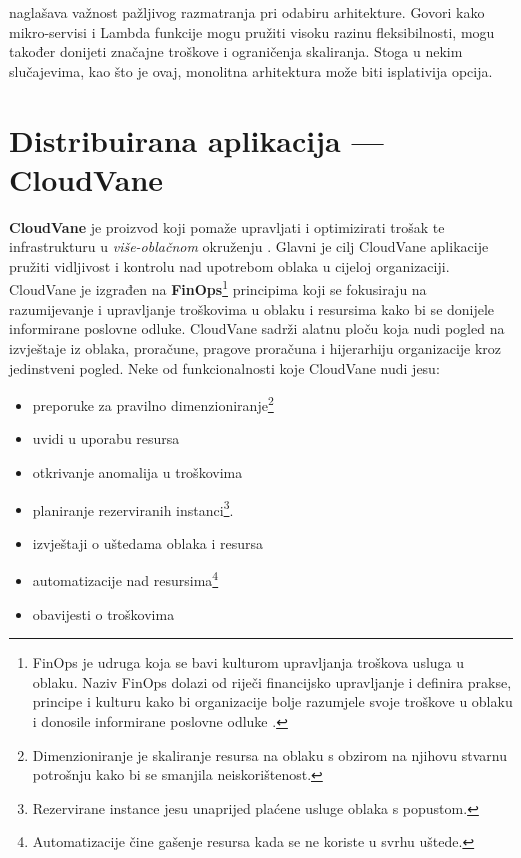 \documentclass[times, utf8, diplomski]{fer}
\begin{document}
\citet{kolny_scaling_2023} naglašava važnost pažljivog razmatranja pri odabiru arhitekture. Govori kako mikro-servisi i Lambda funkcije mogu pružiti visoku razinu fleksibilnosti, mogu također donijeti značajne troškove i ograničenja skaliranja. Stoga u nekim slučajevima, kao što je ovaj, monolitna arhitektura može biti isplativija opcija.



\chapter{Distribuirana aplikacija --- CloudVane}
\label{sec:cloudvane}

\textbf{CloudVane} je proizvod koji pomaže upravljati i optimizirati trošak te infrastrukturu u \emph{više-oblačnom}  okruženju  \citep{neos_cloudvane_2023}. Glavni je cilj CloudVane aplikacije pružiti vidljivost i kontrolu nad upotrebom oblaka  u cijeloj organizaciji. \\

CloudVane je izgrađen na \textbf{FinOps}\footnote{FinOps je udruga koja se bavi kulturom upravljanja troškova usluga u oblaku. Naziv FinOps dolazi od riječi financijsko upravljanje  i definira prakse, principe i kulturu kako bi organizacije bolje razumjele svoje troškove u oblaku i donosile informirane poslovne odluke \citep{finops_fundation_finops_2021}.} principima koji se fokusiraju na razumijevanje i upravljanje troškovima u oblaku i resursima kako bi se donijele informirane poslovne odluke. CloudVane sadrži alatnu ploču  koja nudi pogled na izvještaje iz oblaka, proračune, pragove proračuna i hijerarhiju organizacije kroz jedinstveni pogled.
Neke od funkcionalnosti koje CloudVane nudi jesu:

\begin{itemize} 
\item preporuke za pravilno dimenzioniranje\footnote{Dimenzioniranje je skaliranje resursa na oblaku s obzirom na njihovu stvarnu potrošnju kako bi se smanjila neiskorištenost.}
\item uvidi u uporabu resursa
\item otkrivanje anomalija u troškovima
\item planiranje rezerviranih instanci\footnote{Rezervirane instance  jesu unaprijed plaćene usluge oblaka s popustom.}.
\item izvještaji o uštedama oblaka i resursa
\item automatizacije nad resursima\footnote{Automatizacije čine gašenje resursa kada se ne koriste u svrhu uštede.}
\item obavijesti o troškovima
\end{itemize}
\end{document}
